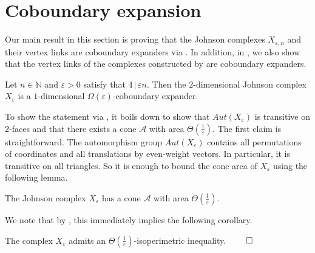 \section{Coboundary expansion} \label{sec:cob-exp-johnson}
Our main result in this section is proving that the Johnson complexes $X_{\varepsilon,n}$ and their vertex links are  coboundary expanders via  . In addition, in , we also show that the vertex links of the complexes constructed by \cite{Golowich2023} are coboundary expanders.
\begin{theorem}\label{thm:coboundary-Johnson-complex}
    Let $n\in \mathbb{N}$ and $\varepsilon>0$ satisfy that $4\, |\, \varepsilon n$. Then the $2$-dimensional Johnson complex $X_{\varepsilon}$ is a $1$-dimensional $\Omega(\varepsilon)$-coboundary expander.
    
\end{theorem}
To show the statement via , it boils down to show that $Aut(X_{\varepsilon})$ is transitive on $2$-faces and that there exists a cone $\mathcal{A}$ with area $\Theta(\frac{1}{\varepsilon})$.
The first claim is straightforward. The automorphism group $Aut(X_{\varepsilon})$ contains all permutations of coordinates and all translations by even-weight vectors. In particular, it is transitive on all triangles. So it is enough to bound the cone area of $X_\varepsilon$ using the following lemma. 
\begin{lemma} \label{lem:cone-for-X}
      The Johnson complex \(X_\varepsilon\) has a cone $\mathcal{A}$ with area \(\Theta(\frac{1}{\varepsilon})\).
\end{lemma}
We note that by , this immediately implies the following corollary.
\begin{corollary} \label{cor:isoperimetric-inequality}
    The complex \(X_\varepsilon\) admits an \(\Theta(\frac{1}{\varepsilon})\)-isoperimetric inequality. \(\qed\)
\end{corollary}

